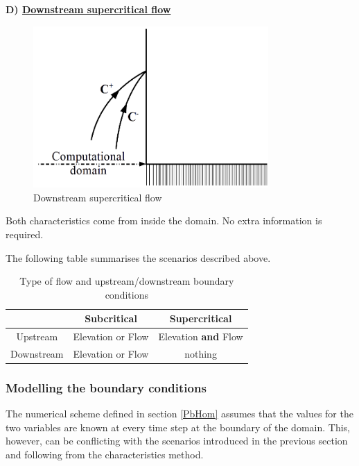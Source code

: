 \textbf{D) \underline{Downstream supercritical flow}}

\begin{figure}[H]
 \begin{center}
  \includegraphics[width=0.8\textwidth]{Figures/AvalTorrentiel.png}
  \caption{Downstream supercritical flow}
 \end{center}
\end{figure}

Both characteristics come from inside the domain. No extra information is required.

The following table summarises the scenarios described above.

\begin{table}[h]
\centering
\caption{Type of flow and upstream/downstream boundary conditions}
\begin{tabular}{c|c|c}
  &\textbf{Subcritical} & \textbf{Supercritical} \\
  \hline
  Upstream & Elevation or Flow & Elevation \textbf{and} Flow \\
  Downstream & Elevation or Flow & nothing \\
  \hline
 \end{tabular}
 \label{TabCL}
\end{table}

\subsubsection{Modelling the boundary conditions}

The numerical scheme defined in section \ref{PbHom} assumes that the values for the two variables are known at every time step at the boundary of the domain. This, however, can be conflicting with the scenarios introduced in the previous section and following from the characteristics method.

